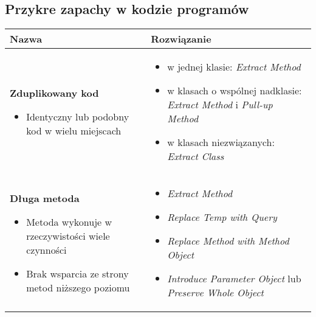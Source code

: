\documentclass[../main.tex]{subfiles}
\begin{document}
    \subsection{Przykre zapachy w kodzie programów}

    \begin{table}[H]
        \begin{center}
            \begin{tabular}{ p{.35\linewidth} p{.65\linewidth} }
                \toprule
                \textbf{Nazwa} & \textbf{Rozwiązanie} \\
                \toprule
                \textbf{Zduplikowany kod}
                \begin{itemize}
                    \item Identyczny lub podobny kod w wielu miejscach
                \end{itemize}
                &
                \begin{itemize}
                    \item w jednej klasie: \textit{Extract Method}
                    \item w klasach o wspólnej nadklasie: \textit{Extract Method} i \textit{Pull-up Method}
                    \item w klasach niezwiązanych: \textit{Extract Class}
                \end{itemize}
                \\

                \cmidrule(r){1-1}\cmidrule(l){2-2}
                \textbf{Długa metoda}

                \begin{itemize}
                    \item Metoda wykonuje w rzeczywistości wiele czynności
                    \item Brak wsparcia ze strony metod niższego poziomu
                \end{itemize}
                &
                \begin{itemize}
                    \item \textit{Extract Method}
                    \item \textit{Replace Temp with Query}
                    \item \textit{Replace Method with Method Object}
                    \item \textit{Introduce Parameter Object} lub \textit{Preserve Whole Object}
                \end{itemize}
                \\


\end{tabular}
\end{center}
\end{table}
\end{document}
